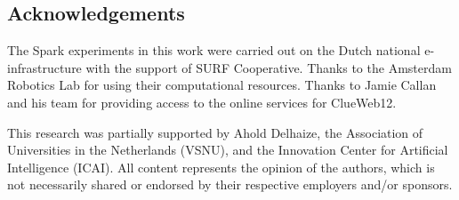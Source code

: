 \documentclass[sigconf,screen=true,natbib]{acmart}
\begin{document}
\subsection*{Acknowledgements}
The Spark experiments in this work were carried out on the Dutch national e-infrastructure with the support of SURF Cooperative. Thanks to the Amsterdam Robotics Lab for using their computational resources. Thanks to Jamie Callan and his team for providing access to the online services for ClueWeb12. 

This research was partially supported by
%
Ahold Delhaize,
%
the Association of Universities in the Netherlands (VSNU),
%
and
%
the Innovation Center for Artificial Intelligence (ICAI).
%
All content represents the opinion of the authors, which is not necessarily shared or endorsed by their respective employers and/or sponsors.



 
\end{document}
